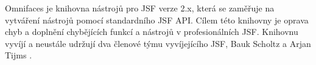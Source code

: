Omnifaces je knihovna nástrojů pro JSF verze 2.x, která se zaměřuje na vytváření nástrojů pomocí standardního JSF API. Cílem této knihovny je oprava chyb a doplnění chybějících funkcí a nástrojů v profesionálních JSF. Knihovnu vyvíjí a neustále udržují dva členové týmu vyvíjejícího JSF, Bauk Scholtz a Arjan Tijms \cite{Technology_Omnifaces}.




